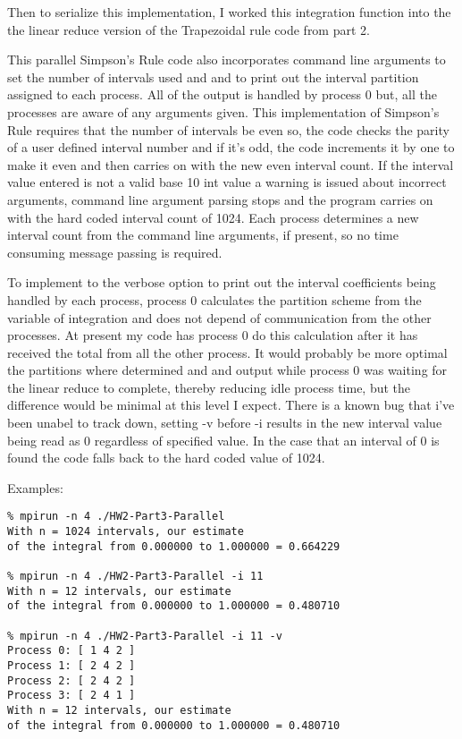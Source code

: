 \documentclass{IEEEtran}
\begin{document}
Then to serialize this implementation, I worked this integration function into the the linear reduce version of the Trapezoidal rule code from part 2. 

This parallel Simpson’s Rule code also incorporates command line arguments to set the number of intervals used and and to print out the interval partition assigned to each process. All of the output is handled by process 0 but, all the processes are aware of any arguments given.  This implementation of Simpson's Rule requires that the number of intervals be even so, the code checks the parity of a user defined interval number and if it’s odd, the code increments it by one to make it even and then carries on with the new even interval count. If the interval value entered is not a valid base 10 int value a warning is issued about incorrect arguments, command line argument parsing stops and the program carries on with the hard coded interval count of 1024. Each process determines a new interval count from the command line arguments, if present, so no time consuming message passing is required. 

To implement to the verbose option to print out the interval coefficients being handled by each process, process 0 calculates the partition scheme from the variable of integration and does not depend of communication from the other processes. At present my code has process 0  do this calculation after it has received the total from all the other process. It would probably be more optimal the partitions where determined and and output while process 0 was waiting for the linear reduce to complete, thereby reducing idle process time, but the difference would be minimal at this level I expect. There is a known bug that i've been unabel to track down, setting -v before -i results in the new interval value being read as 0 regardless of specified value. In the case that an interval of 0 is found the code falls back to the hard coded value of 1024.

Examples:

\begin{verbatim}
% mpirun -n 4 ./HW2-Part3-Parallel         
With n = 1024 intervals, our estimate
of the integral from 0.000000 to 1.000000 = 0.664229

% mpirun -n 4 ./HW2-Part3-Parallel -i 11
With n = 12 intervals, our estimate
of the integral from 0.000000 to 1.000000 = 0.480710

% mpirun -n 4 ./HW2-Part3-Parallel -i 11 -v
Process 0: [ 1 4 2 ]
Process 1: [ 2 4 2 ]
Process 2: [ 2 4 2 ]
Process 3: [ 2 4 1 ]
With n = 12 intervals, our estimate
of the integral from 0.000000 to 1.000000 = 0.480710
\end{verbatim}
\end{document}
